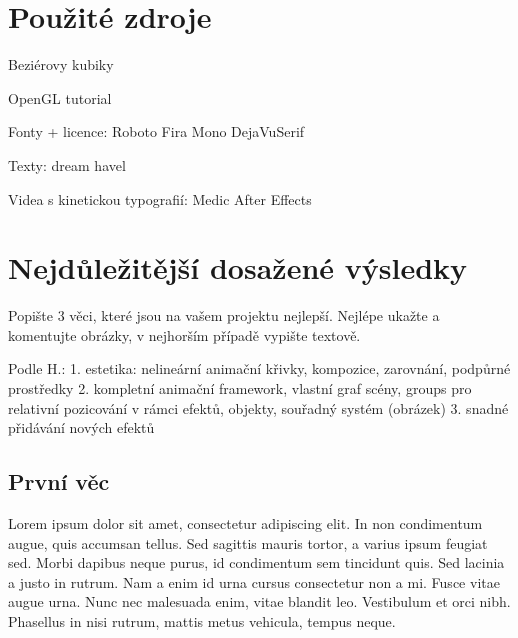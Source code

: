 \documentclass[12pt,a4paper,titlepage,final]{report}
\begin{document}


\chapter{Použité zdroje}

Beziérovy kubiky

OpenGL tutorial

Fonty + licence:
  Roboto
  Fira Mono
  DejaVuSerif

Texty:
  dream
  havel

Videa s kinetickou typografií:
  Medic
  After Effects



\chapter{Nejdůležitější dosažené výsledky}

Popište 3 věci, které jsou na vašem projektu nejlepší. Nejlépe ukažte a
komentujte obrázky, v nejhorším případě vypište textově.

Podle H.:
  1. estetika: nelineární animační křivky, kompozice, zarovnání, podpůrné prostředky
  2. kompletní animační framework, vlastní graf scény, groups pro relativní
     pozicování v rámci efektů, objekty, souřadný systém (obrázek)
  3. snadné přidávání nových efektů

\section{První věc}

Lorem ipsum dolor sit amet, consectetur adipiscing elit. In non condimentum augue, quis accumsan tellus. Sed sagittis mauris tortor, a varius ipsum feugiat sed. Morbi dapibus neque purus, id condimentum sem tincidunt quis. Sed lacinia a justo in rutrum. Nam a enim id urna cursus consectetur non a mi. Fusce vitae augue urna. Nunc nec malesuada enim, vitae blandit leo. Vestibulum et orci nibh. Phasellus in nisi rutrum, mattis metus vehicula, tempus neque.
\end{document}
